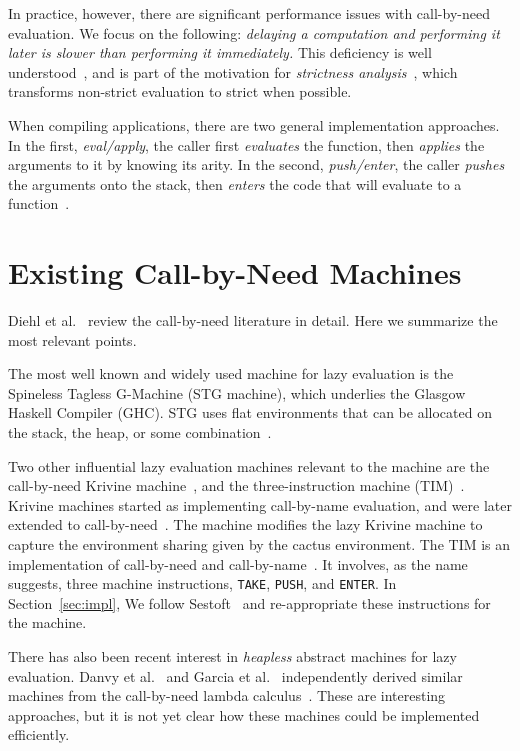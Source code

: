 In practice, however, there are significant performance issues with call-by-need
evaluation.  We focus on the following: \emph{delaying a computation and
performing it later is slower than performing it immediately.} This deficiency
is well understood~\cite{johnsson1984efficient,jonesstg}, and is part of the
motivation for \emph{strictness
analysis}~\cite{mycroft1982abstract,wadler1987projections}, which transforms
non-strict evaluation to strict when possible.

When compiling applications, there are two general implementation approaches.
In the first, \emph{eval/apply}, the caller first \emph{evaluates} the function,
then \emph{applies} the arguments to it by knowing its arity. In the second,
\emph{push/enter}, the caller \emph{pushes} the arguments onto the stack, then
\emph{enters} the code that will evaluate to a function~\cite{marlow2006making}.  

\section{Existing Call-by-Need Machines}

Diehl et al.~\cite{diehl2000abstract} review the call-by-need
literature in detail.  Here we summarize the most relevant points.

The most well known and widely used machine for lazy evaluation is the
Spineless Tagless G-Machine (STG machine), which underlies the Glasgow Haskell
Compiler (GHC).  STG uses flat environments that can be allocated on the stack,
the heap, or some combination~\cite{jonesstg}.  

Two other influential lazy evaluation machines relevant to the \ce 
machine are the call-by-need Krivine machine~\cite{lkm,krivine2007call,sestoft},
and the three-instruction machine (TIM)~\cite{TIM}.  Krivine machines started as
implementing call-by-name evaluation, and were later extended to
call-by-need~\cite{krivine2007call,sestoft,danvy2013synthetic,lkm}.  The \ce
machine modifies the lazy Krivine machine to capture the environment sharing
given by the cactus environment. The TIM is an implementation of call-by-need
and call-by-name~\cite{TIM}.  It involves, as the name suggests, three machine
instructions, \texttt{TAKE}, \texttt{PUSH}, and \texttt{ENTER}. In
Section~\ref{sec:impl}, We follow Sestoft~\cite{sestoft} and
re-appropriate these instructions for the \ce machine.

There has also been recent interest in \emph{heapless} abstract
machines for lazy evaluation. Danvy et al.~\cite{danvy2012inter} and
Garcia et al.~\cite{garcia2009lazy} independently derived similar
machines from the call-by-need lambda calculus~\cite{ariola1995call}. These are interesting approaches, but it is not yet
clear how these machines could be implemented efficiently.

